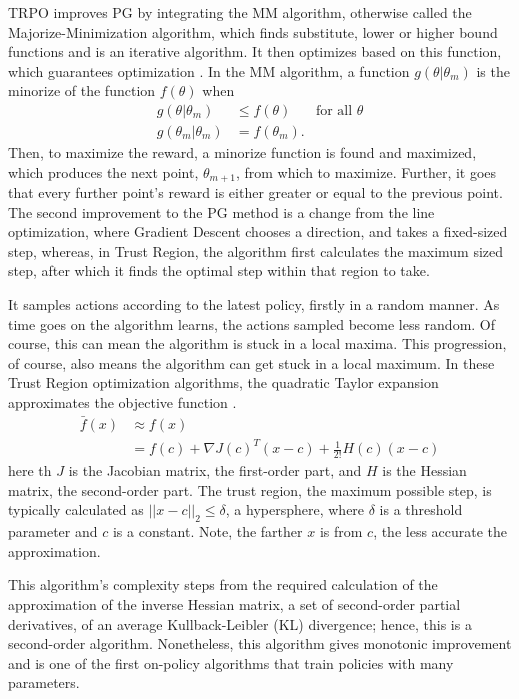 TRPO improves PG by integrating the MM algorithm, otherwise called the Majorize-Minimization algorithm, which finds substitute, lower or higher bound functions and is an iterative algorithm. It then optimizes based on this function, which guarantees optimization \cite{lange_2007}. In the MM algorithm, a function $g(\theta|\theta_m)$ is the minorize of the function $f(\theta)$ when 
\begin{align*}
	g(\theta|\theta_m)&\leq f(\theta) &\text{for all }\theta\\
	g(\theta_m|\theta_m)&=f(\theta_m). 
\end{align*} Then, to maximize the reward, a minorize function is found and maximized, which produces the next point, $\theta_{m+1}$, from which to maximize. Further, it goes that every further point's reward is either greater or equal to the previous point. The second improvement to the PG method is a change from the line optimization, where Gradient Descent chooses a direction, and takes a fixed-sized step, whereas, in Trust Region, the algorithm first calculates the maximum sized step, after which it finds the optimal step within that region to take.

It samples actions according to the latest policy, firstly in a random manner. As time goes on the algorithm learns, the actions sampled become less random. Of course, this can mean the algorithm is stuck in a local maxima. This progression, of course, also means the algorithm can get stuck in a local maximum. In these Trust Region optimization algorithms, the quadratic Taylor expansion approximates the objective function \cite{nocedal_wright_2006}. \begin{align*}
	\bar{f}(x)&\approx f(x) \\
	&=f(c)+\nabla J(c)^T(x-c) + \frac{1}{2!}H(c)(x-c)
\end{align*} here th $J$ is the Jacobian matrix, the first-order part, and $H$ is the Hessian matrix, the second-order part. The trust region, the maximum possible step, is typically calculated as $||x-c||_2\leq \delta$, a hypersphere, where $\delta$ is a threshold parameter and $c$ is a constant. Note, the farther $x$ is from $c$, the less accurate the approximation.

This algorithm's complexity steps from the required calculation of the approximation of the inverse Hessian matrix, a set of second-order partial derivatives, of an average Kullback-Leibler (KL) divergence; hence, this is a second-order algorithm. Nonetheless, this algorithm gives monotonic improvement and is one of the first on-policy algorithms that train policies with many parameters. 

